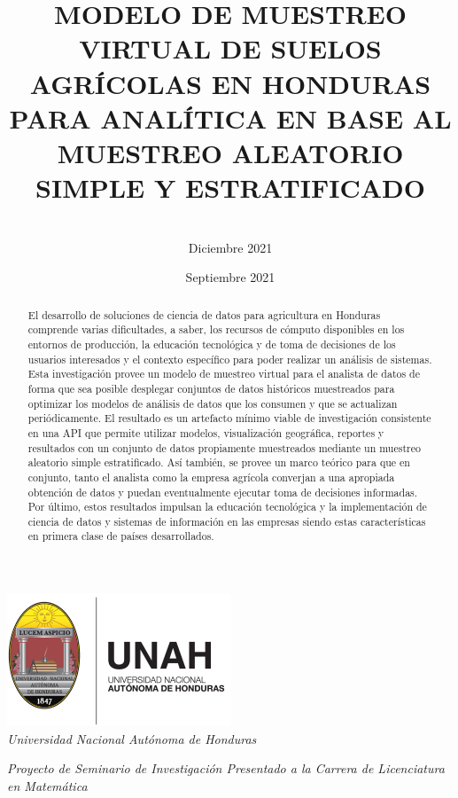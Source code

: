 \documentclass[conference]{IEEEtran}
\title{
MODELO DE MUESTREO VIRTUAL DE SUELOS AGRÍCOLAS EN HONDURAS PARA ANALÍTICA EN BASE AL MUESTREO ALEATORIO SIMPLE Y ESTRATIFICADO
}
\author{
\IEEEauthorblockN{Tobias Briones}
\IEEEauthorblockA{\textit{Universidad Nacional Autónoma de Honduras} \\
\textit{Carrera de Licenciatura en Matemática}\\
San Pedro Sula, Honduras \\
tobias.briones@unah.hn} \\\vspace*{20pt} \normalsize  
Diciembre 2021
}
\date{Septiembre 2021}
\begin{document}
\maketitle

\begin{center}
    \includegraphics[width=0.3\linewidth]{ref/logo-unah.png}\\[4ex]
    \textit{Universidad Nacional Autónoma de Honduras}
    
    \bigbreak
    
    \textit{Proyecto de Seminario de Investigación Presentado a la Carrera de Licenciatura en Matemática}
\end{center}

\begin{abstract}
El desarrollo de soluciones de ciencia de datos para agricultura en Honduras comprende varias dificultades, a saber, los recursos de cómputo disponibles en los entornos de producción, la educación tecnológica y de toma de decisiones de los usuarios interesados y el contexto específico para poder realizar un análisis de sistemas. Esta investigación provee un modelo de muestreo virtual para el analista de datos de forma que sea posible desplegar conjuntos de datos históricos muestreados para optimizar los modelos de análisis de datos que los consumen y que se actualizan periódicamente. El resultado es un artefacto mínimo viable de investigación consistente en una API que permite utilizar modelos, visualización geográfica, reportes y resultados con un conjunto de datos propiamente muestreados mediante un muestreo aleatorio simple estratificado. Así también, se provee un marco teórico para que en conjunto, tanto el analista como la empresa agrícola converjan a una apropiada obtención de datos y puedan eventualmente ejecutar toma de decisiones informadas. Por último, estos resultados impulsan la educación tecnológica y la implementación de ciencia de datos y sistemas de información en las empresas siendo estas características en primera clase de países desarrollados.
\end{abstract}

\bigbreak
\end{document}
